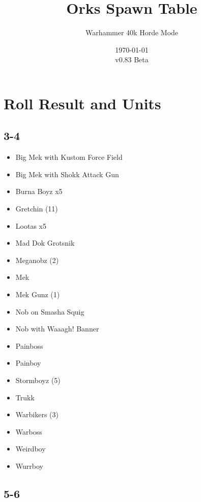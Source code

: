 \documentclass{HordeModeTarot}
\title{Orks Spawn Table}
\author{Warhammer 40k Horde Mode}
\date{\today \\v0.83 Beta}
\begin{document}
\maketitle

\outputUsingSpawnTableBoilerplate
\section{Roll Result and Units}\hypertarget{roll-results}{}\label{roll-results}

\begin{multicols}{2}

\subsection*{3-4}

\begin{itemize}[leftmargin=*]
\item[] Big Mek with Kustom Force Field
\item[] Big Mek with Shokk Attack Gun
\item[] Burna Boyz x5
\item[] Gretchin (11)
\item[] Lootas x5
\item[] Mad Dok Grotsnik
\item[] Meganobz (2)
\item[] Mek
\item[] Mek Gunz (1)
\item[] Nob on Smasha Squig
\item[] Nob with Waaagh! Banner
\item[] Painboss
\item[] Painboy
\item[] Stormboyz (5)
\item[] Trukk
\item[] Warbikers (3)
\item[] Warboss
\item[] Weirdboy
\item[] Wurrboy
\end{itemize}

\subsection*{5-6}


\end{multicols}
\end{document}

